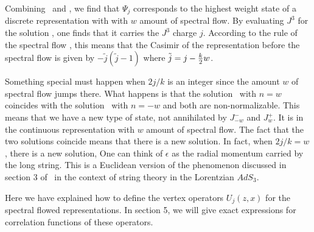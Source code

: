 Combining \hwcond\ and \anotherhw , we find that
$\Psi_j$ corresponds to the highest weight state
of a discrete representation with with $w$ amount
of spectral flow. By evaluating $J^3$ for
the solution \simplest, one finds that it carries
the $J^3$ charge $j$. According to the rule of the
spectral flow \introflow, this means that the Casimir
of the representation before the spectral flow
is given by $-\tilde{j}(\tilde{j}-1)$ where
$\tilde{j} = j - {k \over 2} w$.

Something special must happen when $2j/k$ is an integer
since the amount $w$ of spectral flow jumps there.
What happens is that the solution \perturb\
with $n=w$ coincides with the solution \anotherperturb\
with $n=-w$ and both are non-normalizable. This means
that we have a new type of state, not annihilated by
$J_{-w}^-$ and $J_w^+$. It is in the continuous representation
with $w$ amount of spectral flow. The fact that the
two solutions coincide means that there is a new solution.
In fact, when $2j/k = w$, there is a new solution,
\eqn{}
One can think of $\epsilon$ as the radial momentum carried by the long
string. This is a Euclidean version of the phenomenon
discussed in section 3 of \first\ in the context of string
theory in the Lorentzian $AdS_3$.


Here we have explained how to define the vertex operators
$U_{j}(z,x)$ for the spectral flowed representations. In
section 5, we will give exact  expressions for correlation functions
of these operators.




